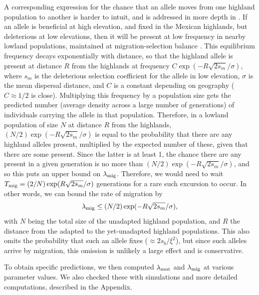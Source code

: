 A corresponding expression for the chance that an allele moves from one highland population to another is harder to intuit,
and is addressed in more depth in \st{\citep{ralphcoop2013patches}}.
If an allele is beneficial at high elevation, and fixed in the Mexican highlands,
but deleterious at low elevations,
then it will be present at low frequency in nearby lowland populations,
maintained at migration-selection balance \citep{slatkin1973geneflow}.
This equilibrium frequency decays exponentially with distance,
so that the highland allele is present at distance $R$ from the highlands at frequency $C \exp(- R \sqrt{2s_m} / \sigma)$,
where $s_m$ is the deleterious selection coefficient for the allele in low elevation,
$\sigma$ is the mean dispersal distance,
and $C$ is a constant depending on geography ($C\approx 1/2$ is close).
Multiplying this frequency by a population size gets the predicted number (average density across a large number of generations) of individuals carrying the allele in that population.
Therefore, in a lowland population of size $N$ at distance $R$ from the highlands,
$(N/2)  \exp(- R \sqrt{2s_m} / \sigma)$ is equal to the probability that there are any highland alleles present,
multiplied by the expected number of these, given that there are some present.
Since the latter is at least 1,
the chance there are any present in a given generation is no more than $(N/2) \exp(- R \sqrt{2s_m} / \sigma)$,
and so this puts an upper bound on $\lambda_{\text{mig}}$.
Therefore, we would need to wait $T_{\text{mig}} = (2/N)\exp(R \sqrt{2s_m} / \sigma)$ generations 
for a rare such excursion to occur.
In other words, we can bound the rate of migration by
\begin{align}
  \lambda_{\text{mig}} \le (N/2)  \exp(- R \sqrt{2s_m} / \sigma) ,
\end{align}
with $N$ being the total size of the unadapted highland population,
and $R$ the distance from the adapted to the yet-unadapted highland populations.
This also omits the probability that such an allele fixes ($\approx 2s_b/\xi^2$), 
but since such alleles arrive by migration, this omission is unlikely a large effect and is conservative.

To obtain specific predictions,
we then computed $\lambda_{\text{mut}}$ and $\lambda_{\text{mig}}$ at various parameter values.
We also checked these with simulations and more detailed computations,
described in the Appendix.



